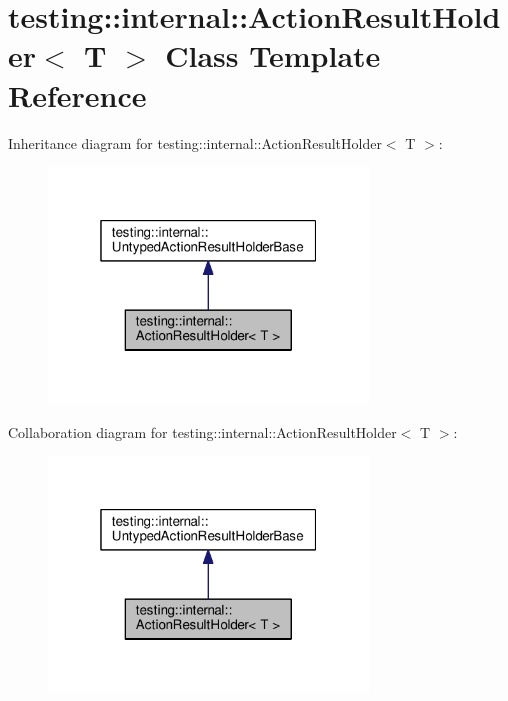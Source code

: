 \hypertarget{classtesting_1_1internal_1_1_action_result_holder}{}\section{testing\+:\+:internal\+:\+:Action\+Result\+Holder$<$ T $>$ Class Template Reference}
\label{classtesting_1_1internal_1_1_action_result_holder}


Inheritance diagram for testing\+:\+:internal\+:\+:Action\+Result\+Holder$<$ T $>$\+:
\nopagebreak
\begin{figure}[H]
\begin{center}
\leavevmode
\includegraphics[width=241pt]{classtesting_1_1internal_1_1_action_result_holder__inherit__graph}
\end{center}
\end{figure}


Collaboration diagram for testing\+:\+:internal\+:\+:Action\+Result\+Holder$<$ T $>$\+:
\nopagebreak
\begin{figure}[H]
\begin{center}
\leavevmode
\includegraphics[width=241pt]{classtesting_1_1internal_1_1_action_result_holder__coll__graph}
\end{center}
\end{figure}
